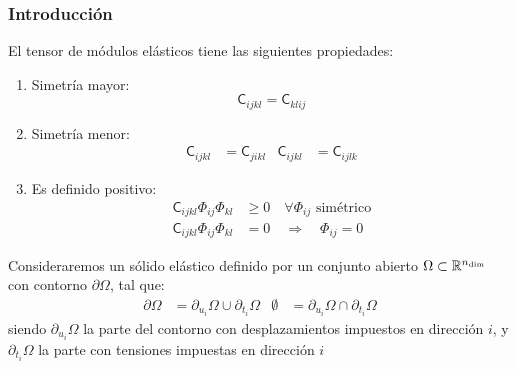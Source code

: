 \documentclass[handout]{beamer}
\begin{document}
\begin{frame}
\frametitle{Introducción}
El tensor de módulos elásticos tiene las siguientes propiedades:
\begin{enumerate}
\item Simetría mayor:
\begin{equation}
\mathsf{C}_{ijkl}=\mathsf{C}_{klij} \label{scmayor}
\end{equation}
\item Simetría menor:
\begin{align}
\mathsf{C}_{ijkl}&=\mathsf{C}_{jikl} &
\mathsf{C}_{ijkl}&=\mathsf{C}_{ijlk}
\end{align}
\item Es definido positivo:
\begin{align}
\mathsf{C}_{ijkl} \Phi_{ij} \Phi_{kl}& \geq 0 \quad \forall \Phi_{ij}
\textrm{ simétrico} \label{sfcdpos1}\\
\mathsf{C}_{ijkl} \Phi_{ij} \Phi_{kl} &=0 \quad \Rightarrow \quad
\Phi_{ij}=0 \label{sfcdpos2}
\end{align}
\end{enumerate}
Consideraremos un sólido elástico definido por un conjunto abierto
$\Omega \subset \mathbb{R}^{n_{\rm dim}}$ con contorno
$\partial \Omega$, tal que:
\begin{align}
\partial \Omega &=\partial_{u_i} \Omega \cup \partial_{t_i} \Omega &
\emptyset       &=\partial_{u_i} \Omega \cap \partial_{t_i} \Omega
\end{align}
siendo $\partial_{u_i} \Omega$ la parte del contorno con desplazamientos
impuestos en dirección $i$, y $\partial_{t_i} \Omega$ la parte con tensiones
impuestas en dirección $i$
\end{frame}
\end{document}
